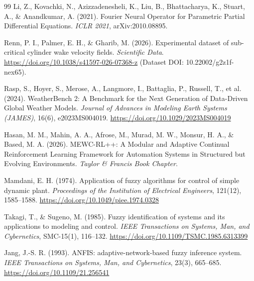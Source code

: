 \documentclass[11pt,a4paper]{article}
\begin{document}
\begin{thebibliography}{99}
Li, Z., Kovachki, N., Azizzadenesheli, K., Liu, B., Bhattacharya, K., Stuart, A., \& Anandkumar, A. (2021). Fourier Neural Operator for Parametric Partial Differential Equations. \textit{ICLR 2021}, arXiv:2010.08895.

Renn, P. I., Palmer, E. H., \& Gharib, M. (2026). Experimental dataset of sub-critical cylinder wake velocity fields. \textit{Scientific Data}. \url{https://doi.org/10.1038/s41597-026-07368-z} (Dataset DOI: 10.22002/g2z1f-nex65).

Rasp, S., Hoyer, S., Merose, A., Langmore, I., Battaglia, P., Russell, T., et al. (2024). WeatherBench 2: A Benchmark for the Next Generation of Data-Driven Global Weather Models. \textit{Journal of Advances in Modeling Earth Systems (JAMES)}, 16(6), e2023MS004019. \url{https://doi.org/10.1029/2023MS004019}

Hasan, M. M., Mahin, A. A., Afrose, M., Murad, M. W., Monsur, H. A., \& Based, M. A. (2026). MEWC-RL++: A Modular and Adaptive Continual Reinforcement Learning Framework for Automation Systems in Structured but Evolving Environments. \textit{Taylor \& Francis Book Chapter}.

Mamdani, E. H. (1974). Application of fuzzy algorithms for control of simple dynamic plant. \textit{Proceedings of the Institution of Electrical Engineers}, 121(12), 1585--1588. \url{https://doi.org/10.1049/piee.1974.0328}

Takagi, T., \& Sugeno, M. (1985). Fuzzy identification of systems and its applications to modeling and control. \textit{IEEE Transactions on Systems, Man, and Cybernetics}, SMC-15(1), 116--132. \url{https://doi.org/10.1109/TSMC.1985.6313399}

Jang, J.-S. R. (1993). ANFIS: adaptive-network-based fuzzy inference system. \textit{IEEE Transactions on Systems, Man, and Cybernetics}, 23(3), 665--685. \url{https://doi.org/10.1109/21.256541}

\end{thebibliography}
\end{document}
